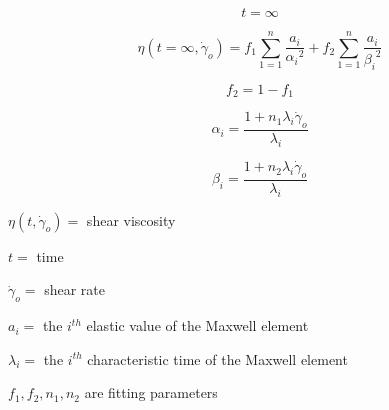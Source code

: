 \documentclass{article}
\begin{document}

$$ t = \infty $$

$$ \eta (t = \infty, \dot{\gamma}_o) = f_1 \sum_{1=1}^{n} \frac{a_i}{{\alpha_i}^2} + f_2 \sum_{1=1}^{n} \frac{a_i}{{\beta_i}^2} $$

$$ f_2 = 1 - f_1 $$

$$ \alpha_i = \frac{1 + n_1 \lambda_i \dot{\gamma}_o}{\lambda_i} $$

$$ \beta_i  = \frac{1 + n_2 \lambda_i \dot{\gamma}_o}{\lambda_i} $$

$\eta (t, \dot{\gamma}_o) =$ shear viscosity

$t =$ time

$\dot{\gamma}_o =$ shear rate

$a_i =$ the $i^{th}$ elastic value of the Maxwell element

$\lambda_i =$ the $i^{th}$ characteristic time of the Maxwell element

$f_1, f_2, n_1, n_2$ are fitting parameters
\end{document}
